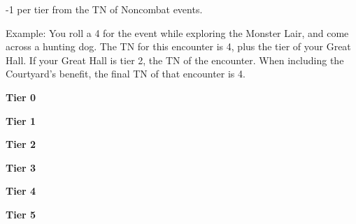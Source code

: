 -1 per tier from the TN of \cirpip Noncombat events.
\skipline

Example: You roll a 4 for the event while exploring the Monster Lair, and come across a hunting dog. The TN for this encounter is 4, plus the tier of your Great Hall. If your Great Hall is tier 2, the TN of the encounter. When including the Courtyard’s benefit, the final TN of that encounter is 4.

\skipline

\begin{tabbox}[4][4]
	
	\textbf{Tier 0}\\
	
	\skipline
	
	\textbf{Tier 1}\\
	
	\skipline
	
	\textbf{Tier 2}\\
	
	\skipline
	
	\textbf{Tier 3}\\
	
	\skipline
	
	\textbf{Tier 4}\\
	
	\skipline
	
	\textbf{Tier 5}\\
	
	\skipline
\end{tabbox}